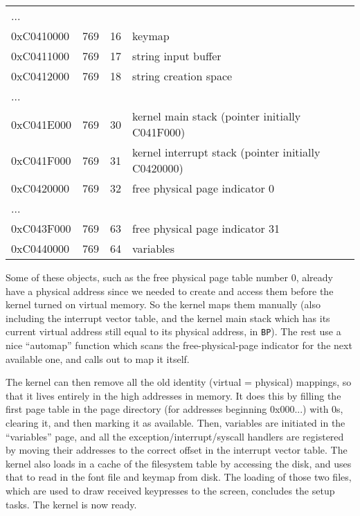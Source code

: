 \documentclass[12pt,a4paper]{report}
\begin{document}
\begin{center}
\begin{tabular}{|l|l|l|l|}
    ...        &       &       &                                                     \\
    0xC0410000 & 769   & 16    & keymap                                              \\
    0xC0411000 & 769   & 17    & string input buffer                                 \\
    0xC0412000 & 769   & 18    & string creation space                               \\
    ...        &       &       &                                                     \\
    0xC041E000 & 769   & 30    & kernel main stack (pointer initially C041F000)      \\
    0xC041F000 & 769   & 31    & kernel interrupt stack (pointer initially C0420000) \\
    0xC0420000 & 769   & 32    & free physical page indicator 0                      \\
    ...        &       &       &                                                     \\
    0xC043F000 & 769   & 63    & free physical page indicator 31                     \\
    0xC0440000 & 769   & 64    & variables                                           \\
    \hline
  \end{tabular}
\end{center}

Some of these objects, such as the free physical page table number 0, already have a physical address since we needed to create and access them before the kernel turned on virtual memory. So the kernel maps them manually (also including the interrupt vector table, and the kernel main stack which has its current virtual address still equal to its physical address, in \texttt{BP}). The rest use a nice ``automap'' function which scans the free-physical-page indicator for the next available one, and calls out to map it itself.

The kernel can then remove all the old identity (virtual = physical) mappings, so that it lives entirely in the high addresses in memory. It does this by filling the first page table in the page directory (for addresses beginning 0x000...) with 0s, clearing it, and then marking it as available. Then, variables are initiated in the ``variables'' page, and all the exception/interrupt/syscall handlers are registered by moving their addresses to the correct offset in the interrupt vector table. The kernel also loads in a cache of the filesystem table by accessing the disk, and uses that to read in the font file and keymap from disk. The loading of those two files, which are used to draw received keypresses to the screen, concludes the setup tasks. The kernel is now ready.
\end{document}
